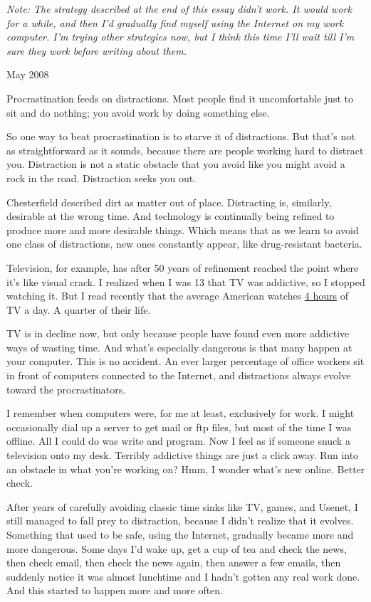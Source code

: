 \emph{Note: The strategy described at the end of this essay didn't work.
It would work for a while, and then I'd gradually find myself using the
Internet on my work computer. I'm trying other strategies now, but I
think this time I'll wait till I'm sure they work before writing about
them.}

May 2008

Procrastination feeds on distractions. Most people find it uncomfortable
just to sit and do nothing; you avoid work by doing something else.

So one way to beat procrastination is to starve it of distractions. But
that's not as straightforward as it sounds, because there are people
working hard to distract you. Distraction is not a static obstacle that
you avoid like you might avoid a rock in the road. Distraction seeks you
out.

Chesterfield described dirt as matter out of place. Distracting is,
similarly, desirable at the wrong time. And technology is continually
being refined to produce more and more desirable things. Which means
that as we learn to avoid one class of distractions, new ones constantly
appear, like drug-resistant bacteria.

Television, for example, has after 50 years of refinement reached the
point where it's like visual crack. I realized when I was 13 that TV was
addictive, so I stopped watching it. But I read recently that the
average American watches
\href{http://www.forbes.com/forbes/2003/0929/076.html}{4 hours} of TV a
day. A quarter of their life.

TV is in decline now, but only because people have found even more
addictive ways of wasting time. And what's especially dangerous is that
many happen at your computer. This is no accident. An ever larger
percentage of office workers sit in front of computers connected to the
Internet, and distractions always evolve toward the procrastinators.

I remember when computers were, for me at least, exclusively for work. I
might occasionally dial up a server to get mail or ftp files, but most
of the time I was offline. All I could do was write and program. Now I
feel as if someone snuck a television onto my desk. Terribly addictive
things are just a click away. Run into an obstacle in what you're
working on? Hmm, I wonder what's new online. Better check.

After years of carefully avoiding classic time sinks like TV, games, and
Usenet, I still managed to fall prey to distraction, because I didn't
realize that it evolves. Something that used to be safe, using the
Internet, gradually became more and more dangerous. Some days I'd wake
up, get a cup of tea and check the news, then check email, then check
the news again, then answer a few emails, then suddenly notice it was
almost lunchtime and I hadn't gotten any real work done. And this
started to happen more and more often.

